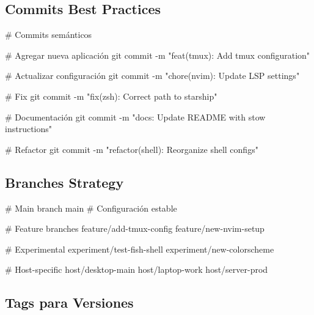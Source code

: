 \documentclass[
  doc,
  floatsintext,
  longtable,
  a4paper,
  nolmodern,
  notxfonts,
  notimes,
  12pt,
  colorlinks=true,linkcolor=blue,citecolor=blue,urlcolor=blue]{apa7}
\newenvironment{Shaded}{\begin{snugshade}}{\end{snugshade}}
\newcommand{\AttributeTok}[1]{\textcolor[rgb]{0.40,0.45,0.13}{#1}}
\newcommand{\CommentTok}[1]{\textcolor[rgb]{0.37,0.37,0.37}{#1}}
\newcommand{\ExtensionTok}[1]{\textcolor[rgb]{0.00,0.23,0.31}{#1}}
\newcommand{\FunctionTok}[1]{\textcolor[rgb]{0.28,0.35,0.67}{#1}}
\newcommand{\NormalTok}[1]{\textcolor[rgb]{0.00,0.23,0.31}{#1}}
\newcommand{\StringTok}[1]{\textcolor[rgb]{0.13,0.47,0.30}{#1}}
\begin{document}
\subsection{Commits Best Practices}\label{commits-best-practices}

\begin{Shaded}
\begin{Highlighting}[]
\CommentTok{\# Commits semánticos}

\CommentTok{\# Agregar nueva aplicación}
\FunctionTok{git}\NormalTok{ commit }\AttributeTok{{-}m} \StringTok{"feat(tmux): Add tmux configuration"}

\CommentTok{\# Actualizar configuración}
\FunctionTok{git}\NormalTok{ commit }\AttributeTok{{-}m} \StringTok{"chore(nvim): Update LSP settings"}

\CommentTok{\# Fix}
\FunctionTok{git}\NormalTok{ commit }\AttributeTok{{-}m} \StringTok{"fix(zsh): Correct path to starship"}

\CommentTok{\# Documentación}
\FunctionTok{git}\NormalTok{ commit }\AttributeTok{{-}m} \StringTok{"docs: Update README with stow instructions"}

\CommentTok{\# Refactor}
\FunctionTok{git}\NormalTok{ commit }\AttributeTok{{-}m} \StringTok{"refactor(shell): Reorganize shell configs"}
\end{Highlighting}
\end{Shaded}

\subsection{Branches Strategy}\label{branches-strategy}

\begin{Shaded}
\begin{Highlighting}[]
\CommentTok{\# Main branch}
\ExtensionTok{main}  \CommentTok{\# Configuración estable}

\CommentTok{\# Feature branches}
\ExtensionTok{feature/add{-}tmux{-}config}
\ExtensionTok{feature/new{-}nvim{-}setup}

\CommentTok{\# Experimental}
\ExtensionTok{experiment/test{-}fish{-}shell}
\ExtensionTok{experiment/new{-}colorscheme}

\CommentTok{\# Host{-}specific}
\ExtensionTok{host/desktop{-}main}
\ExtensionTok{host/laptop{-}work}
\ExtensionTok{host/server{-}prod}
\end{Highlighting}
\end{Shaded}

\subsection{Tags para Versiones}\label{tags-para-versiones}
\end{document}
